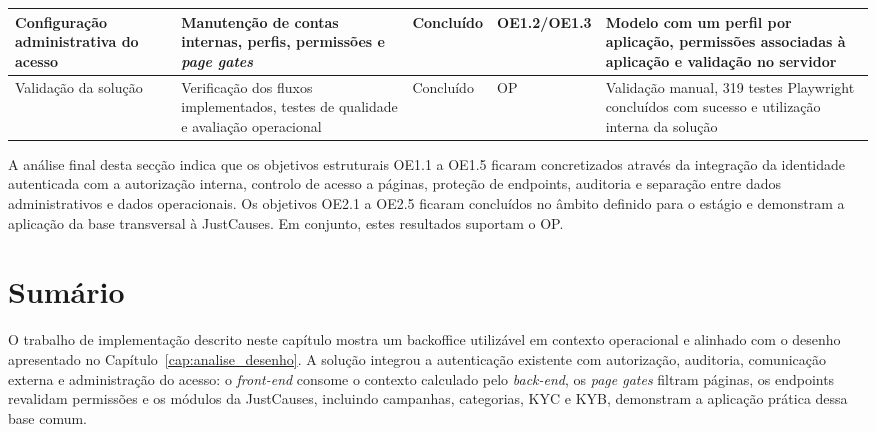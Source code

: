 \begin{table}[H]
\begin{center}
\begin{tabular}{|>{\raggedright\arraybackslash}p{2.3cm}|>{\raggedright\arraybackslash}p{3.2cm}|>{\raggedright\arraybackslash}p{1.2cm}|>{\raggedright\arraybackslash}p{1.8cm}|>{\raggedright\arraybackslash}p{3.7cm}|}
Configuração administrativa do acesso & Manutenção de contas internas, perfis, permissões e \textit{page gates} & Concluído & OE1.2/OE1.3 & Modelo com um perfil por aplicação, permissões associadas à aplicação e validação no servidor \\ \hline
Validação da solução & Verificação dos fluxos implementados, testes de qualidade e avaliação operacional & Concluído & OP & Validação manual, 319 testes Playwright concluídos com sucesso e utilização interna da solução \\ \hline
\end{tabular}
\endgroup
\end{center}
\end{table}

A análise final desta secção indica que os objetivos estruturais OE1.1 a OE1.5 ficaram concretizados através da integração da identidade autenticada com a autorização interna, controlo de acesso a páginas, proteção de endpoints, auditoria e separação entre dados administrativos e dados operacionais. Os objetivos OE2.1 a OE2.5 ficaram concluídos no âmbito definido para o estágio e demonstram a aplicação da base transversal à JustCauses. Em conjunto, estes resultados suportam o OP.

\section{Sumário}
\label{sec:sumario_cap4}

O trabalho de implementação descrito neste capítulo mostra um backoffice utilizável em contexto operacional e alinhado com o desenho apresentado no Capítulo~\ref{cap:analise_desenho}. A solução integrou a autenticação existente com autorização, auditoria, comunicação externa e administração do acesso: o \textit{front-end} consome o contexto calculado pelo \textit{back-end}, os \textit{page gates} filtram páginas, os endpoints revalidam permissões e os módulos da JustCauses, incluindo campanhas, categorias, \gls{KYC} e \gls{KYB}, demonstram a aplicação prática dessa base comum.
